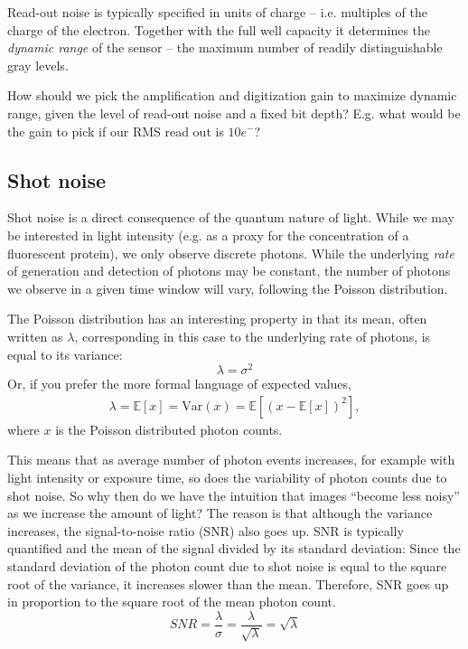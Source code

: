 \documentclass[a4paper]{report}
\newcommand{\nexercise}[0]{\arabic{exercises}\addtocounter{exercises}{1}}
\begin{document}
Read-out noise is typically specified in units of charge -- i.e. multiples of the charge of the electron. 
Together with the full well capacity it determines the \textit{dynamic range} of the sensor -- the maximum number of readily distinguishable gray levels. 

\begin{exercisebox}[frametitle={Exercise \nexercise: Picking optimal gain}]
How should we pick the amplification and digitization gain to maximize dynamic range, given the level of read-out noise and a fixed bit depth? E.g. what would be the gain to pick if our RMS read out is $10e^-$?
\end{exercisebox}

\subsection{Shot noise}
Shot noise is a direct consequence of the quantum nature of light. While we may be interested in light intensity (e.g. as a proxy for the concentration of a fluorescent protein), we only observe discrete photons. 
While the underlying \textit{rate} of generation and detection of photons may be constant, the number of photons we observe in a given time window will vary, following the Poisson distribution.

The Poisson distribution has an interesting property in that its mean, often written as $\lambda$, corresponding in this case to the underlying rate of photons, is equal to its variance:
\begin{equation}
	\lambda = \sigma^2
\end{equation}
Or, if you prefer the more formal language of expected values,
\begin{align}
	\lambda = \mathbb { E } [ x ] = \mathrm { Var } ( x )  = \mathbb { E } [ (x - \mathbb { E } [ x ])^2 ],
\end{align}
where $x$ is the Poisson distributed photon counts.

This means that as average number of photon events increases, for example with light intensity or exposure time, so does the variability of photon counts due to shot noise.
So why then do we have the intuition that images ``become less noisy'' as we increase the amount of light? 
The reason is that although the variance increases, the signal-to-noise ratio (SNR) also goes up. 
SNR is typically quantified and the mean of the signal divided by its standard deviation:
Since the standard deviation of the photon count due to shot noise is equal to the square root of the variance, it increases slower than the mean. 
Therefore, SNR goes up in proportion to the square root of the mean photon count.
\begin{equation}
	SNR = \frac{\lambda}{\sigma} = \frac{\lambda}{\sqrt{\lambda}} = \sqrt{\lambda}
\end{equation}
\end{document}
